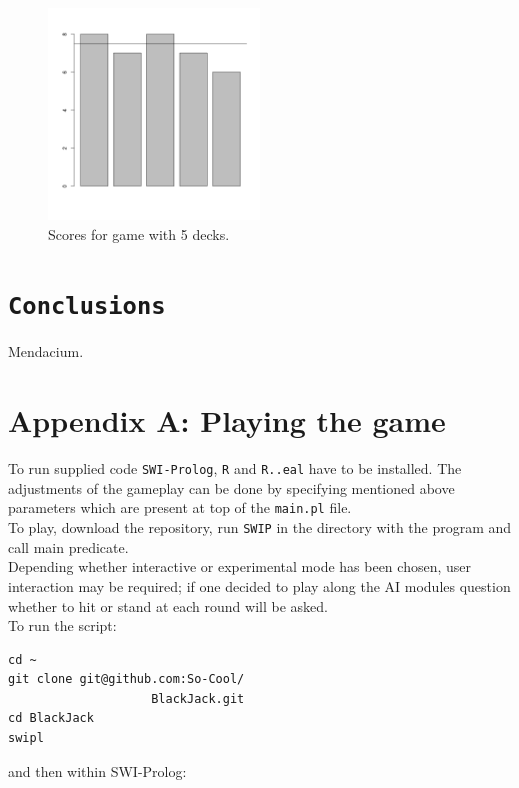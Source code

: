 \documentclass[12pt,a4paper,twocolumn]{article}
\begin{document}
\begin{figure}[htbp]
\centering
\includegraphics[width=0.5\textwidth]{5decks}
\caption{Scores for game with 5 decks.\label{fig:5dec}}
\end{figure}


\section*{\texttt{Conclusions}}
Mendacium.



\cleardoublepage
\newpage
\section*{Appendix A: Playing the game}
To run supplied code \texttt{SWI-Prolog}, \texttt{R} and \texttt{R..eal} have to be installed. The adjustments of the gameplay can be done by specifying mentioned above parameters which are present at top of the \texttt{main.pl} file.\\



To play, download the repository, run \texttt{SWIP} in the directory with the program and call main predicate.\\
Depending whether interactive or experimental mode has been chosen, user interaction may be required; if one decided to play along the AI modules question whether to hit or stand at each round will be asked.\\

To run the script:

\lstset{language=bash}
\begin{lstlisting}[frame=single]
cd ~
git clone git@github.com:So-Cool/
                    BlackJack.git
cd BlackJack
swipl
\end{lstlisting}

and then within SWI-Prolog:
\end{document}
